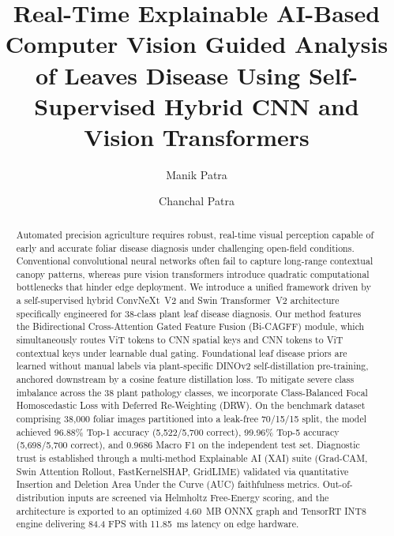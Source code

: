 \documentclass[runningheads]{llncs}
\begin{document}
%
\title{Real-Time Explainable AI-Based Computer Vision Guided Analysis of Leaves Disease Using Self-Supervised Hybrid CNN and Vision Transformers}
%
%
\author{Manik Patra \and Chanchal Patra}
%
%
%
\maketitle

\begin{abstract}
Automated precision agriculture requires robust, real-time visual perception capable of early and accurate foliar disease diagnosis under challenging open-field conditions. Conventional convolutional neural networks often fail to capture long-range contextual canopy patterns, whereas pure vision transformers introduce quadratic computational bottlenecks that hinder edge deployment. We introduce a unified framework driven by a self-supervised hybrid ConvNeXt~V2 and Swin Transformer~V2 architecture specifically engineered for 38-class plant leaf disease diagnosis. Our method features the Bidirectional Cross-Attention Gated Feature Fusion (Bi-CAGFF) module, which simultaneously routes ViT tokens to CNN spatial keys and CNN tokens to ViT contextual keys under learnable dual gating. Foundational leaf disease priors are learned without manual labels via plant-specific DINOv2 self-distillation pre-training, anchored downstream by a cosine feature distillation loss. To mitigate severe class imbalance across the 38 plant pathology classes, we incorporate Class-Balanced Focal Homoscedastic Loss with Deferred Re-Weighting (DRW). On the benchmark dataset comprising 38,000 foliar images partitioned into a leak-free 70/15/15 split, the model achieved 96.88\% Top-1 accuracy (5,522/5,700 correct), 99.96\% Top-5 accuracy (5,698/5,700 correct), and 0.9686 Macro F1 on the independent test set. Diagnostic trust is established through a multi-method Explainable AI (XAI) suite (Grad-CAM, Swin Attention Rollout, FastKernelSHAP, GridLIME) validated via quantitative Insertion and Deletion Area Under the Curve (AUC) faithfulness metrics. Out-of-distribution inputs are screened via Helmholtz Free-Energy scoring, and the architecture is exported to an optimized 4.60~MB ONNX graph and TensorRT INT8 engine delivering 84.4 FPS with 11.85~ms latency on edge hardware.

\end{abstract}
\end{document}
